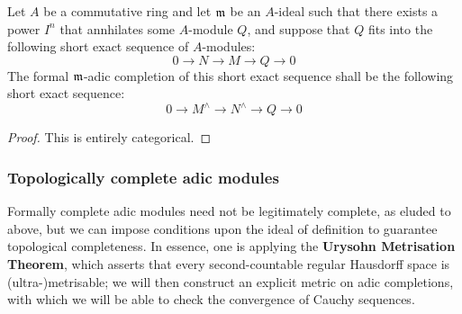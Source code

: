             \begin{proposition} \label{prop: formal_completions_along_annihilating_ideals}
                Let $A$ be a commutative ring and let $\mathfrak{m}$ be an $A$-ideal such that there exists a power $I^n$ that annhilates some $A$-module $Q$, and suppose that $Q$ fits into the following short exact sequence of $A$-modules:
                    $$0 \to N \to M \to Q \to 0$$
                The formal $\mathfrak{m}$-adic completion of this short exact sequence shall be the following short exact sequence:
                    $$0 \to M^{\wedge} \to N^{\wedge} \to Q \to 0$$
            \end{proposition}
                \begin{proof}
                    This is entirely categorical.
                \end{proof}
        
        \subsubsection{Topologically complete adic modules}
            Formally complete adic modules need not be legitimately complete, as eluded to above, but we can impose conditions upon the ideal of definition to guarantee topological completeness. In essence, one is applying the \textbf{Urysohn Metrisation Theorem}, which asserts that every second-countable regular Hausdorff space is (ultra-)metrisable; we will then construct an explicit metric on adic completions, with which we will be able to check the convergence of Cauchy sequences.
            

